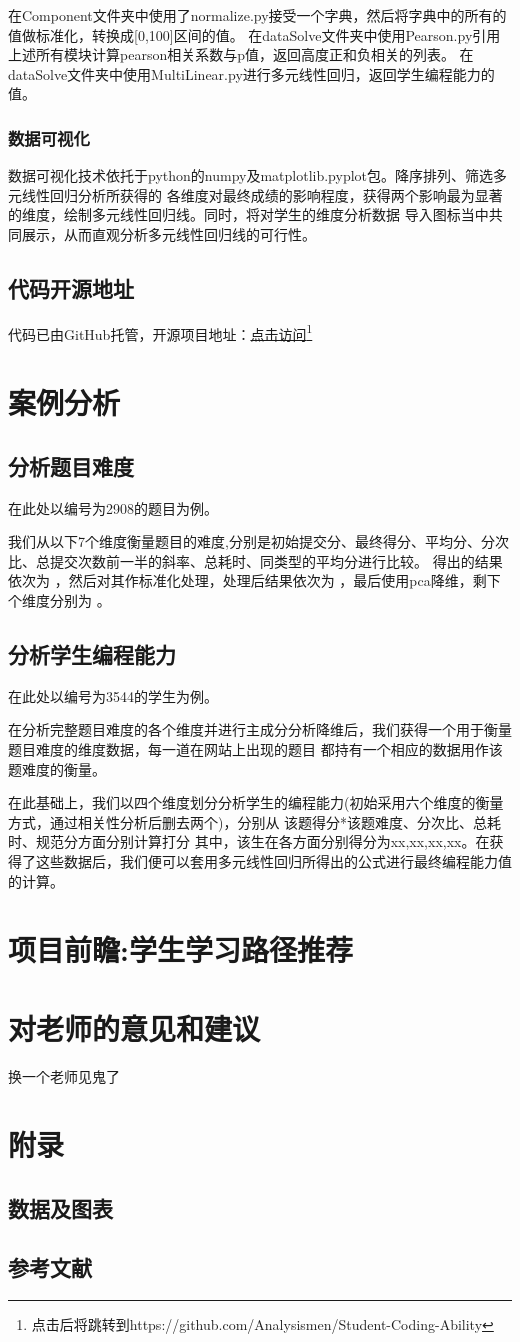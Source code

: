 \documentclass[UTF8]{ctexart}
\begin{document}
在Component文件夹中使用了normalize.py接受一个字典，然后将字典中的所有的值做标准化，转换成[0,100]区间的值。
在dataSolve文件夹中使用Pearson.py引用上述所有模块计算pearson相关系数与p值，返回高度正和负相关的列表。
在dataSolve文件夹中使用MultiLinear.py进行多元线性回归，返回学生编程能力的值。
\subsubsection{数据可视化}
数据可视化技术依托于python的numpy及matplotlib.pyplot包。降序排列、筛选多元线性回归分析所获得的
各维度对最终成绩的影响程度，获得两个影响最为显著的维度，绘制多元线性回归线。同时，将对学生的维度分析数据
导入图标当中共同展示，从而直观分析多元线性回归线的可行性。
\subsection{代码开源地址}
代码已由GitHub托管，开源项目地址：\href{https://github.com/Analysismen/Student-Coding-Ability}{点击访问}\footnote{点击后将跳转到https://github.com/Analysismen/Student-Coding-Ability}
\section{案例分析}
\subsection{分析题目难度}
在此处以编号为2908的题目为例。

我们从以下7个维度衡量题目的难度,分别是初始提交分、最终得分、平均分、分次比、总提交次数前一半的斜率、总耗时、同类型的平均分进行比较。
得出的结果依次为               ，然后对其作标准化处理，处理后结果依次为        ，最后使用pca降维，剩下 个维度分别为   。
\subsection{分析学生编程能力}
在此处以编号为3544的学生为例。

在分析完整题目难度的各个维度并进行主成分分析降维后，我们获得一个用于衡量题目难度的维度数据，每一道在网站上出现的题目
都持有一个相应的数据用作该题难度的衡量。

在此基础上，我们以四个维度划分分析学生的编程能力(初始采用六个维度的衡量方式，通过相关性分析后删去两个)，分别从 该题得分*该题难度、分次比、总耗时、规范分方面分别计算打分
其中，该生在各方面分别得分为xx,xx,xx,xx。在获得了这些数据后，我们便可以套用多元线性回归所得出的公式进行最终编程能力值的计算。
\section{项目前瞻:学生学习路径推荐}
\section{对老师的意见和建议}
换一个老师见鬼了
\section{附录}
\subsection{数据及图表}
\subsection{参考文献}
\end{document}
